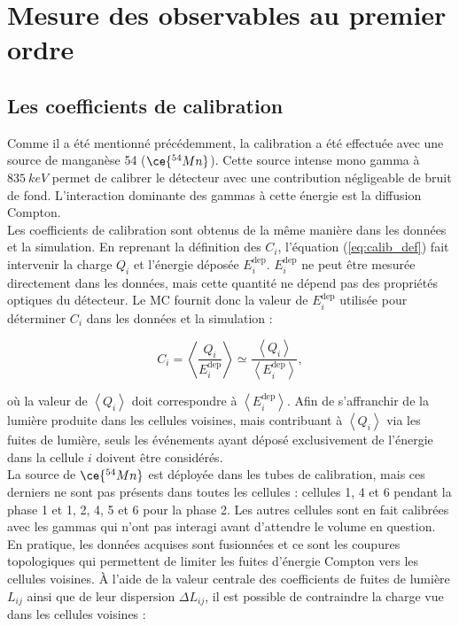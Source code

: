 %

\bigbreak

\section{Mesure des observables au premier ordre}

\subsection{Les coefficients de calibration}

Comme il a été mentionné précédemment, la calibration a été effectuée avec une source de manganèse 54 ($\ce{^{54}Mn}$). Cette source intense mono gamma à $\SI{835}{keV}$ permet de calibrer le détecteur avec une contribution négligeable de bruit de fond. L'interaction dominante des gammas à cette énergie est la diffusion Compton.\\

Les coefficients de calibration sont obtenus de la même manière dans les données et la simulation. En reprenant la définition des $C_i$, l'équation (\ref{eq:calib_def}) fait intervenir la charge $Q_i$ et l'énergie déposée $E_i^{\textrm{dep}}$. $E_i^{\textrm{dep}}$ ne peut être mesurée directement dans les données, mais cette quantité ne dépend pas des propriétés optiques du détecteur. Le MC fournit donc la valeur de $E_i^{\textrm{dep}}$ utilisée pour déterminer $C_i$ dans les données et la simulation :

\begin{equation}
    C_i = \left<\frac{Q_i}{E_i^{\textrm{dep}}}\right> \simeq \frac{\left<Q_i\right>}{\left<E_i^{\textrm{dep}}\right>},
    \label{eq:calib_def}
\end{equation}

\bigbreak

où la valeur de $\left<Q_i\right>$ doit correspondre à $\left<E_i^{\textrm{dep}}\right>$.  Afin de s'affranchir de la lumière produite dans les cellules voisines, mais contribuant à $\left<Q_i\right>$ via les fuites de lumière, seuls les événements ayant déposé exclusivement de l'énergie dans la cellule $i$ doivent être considérés.\\

La source de $\ce{^{54}Mn}$ est déployée dans les tubes de calibration, mais ces derniers ne sont pas présents dans toutes les cellules : cellules 1, 4 et 6 pendant la phase 1 et 1, 2, 4, 5 et 6 pour la phase 2. Les autres cellules sont en fait calibrées avec les gammas qui n'ont pas interagi avant d'attendre le volume en question. En pratique, les données acquises sont fusionnées et ce sont les coupures topologiques qui permettent de limiter les fuites d'énergie Compton vers les cellules voisines. À l'aide de la valeur centrale des coefficients de fuites de lumière $L_{ij}$ ainsi que de leur dispersion $\Delta L_{ij}$, il est possible de contraindre la charge vue dans les cellules voisines :

